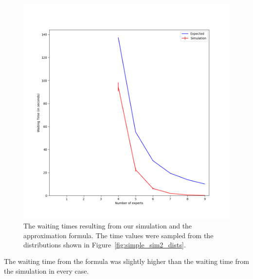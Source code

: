 \begin{figure}[h]
  \includegraphics[width=\textwidth]{figures/montecarlo/independent_calls_expon.png}
  \caption{
    The waiting times resulting from our simulation and the approximation
    formula.
    The time values were sampled from the distributions shown in
    Figure~\ref{fig:simple_sim2_dists}.
  }\label{fig:simple_sim2_results}
\end{figure}

The waiting time from the formula was slightly higher than the waiting time from
the simulation in every case.